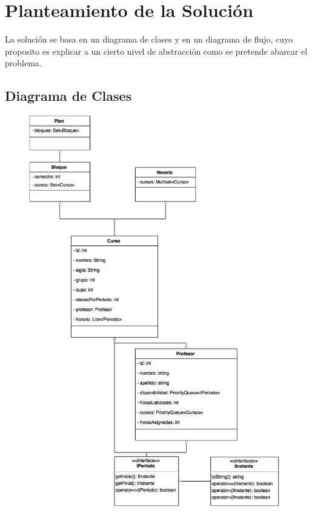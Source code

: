 \documentclass[paper=letter, fontsize=12pt]{article}
\begin{document}
\section{Planteamiento de la Solución}
La solución se basa en un diagrama de clases y en un diagrama de flujo, cuyo
proposito es explicar a un cierto nivel de abstracción como se pretende abarcar
el problema.

\subsection{Diagrama de Clases}

\begin{figure}[H]
  \centering
  \includegraphics[scale=0.6]{HorariosCursos1.png}
\end{figure}
\end{document}

